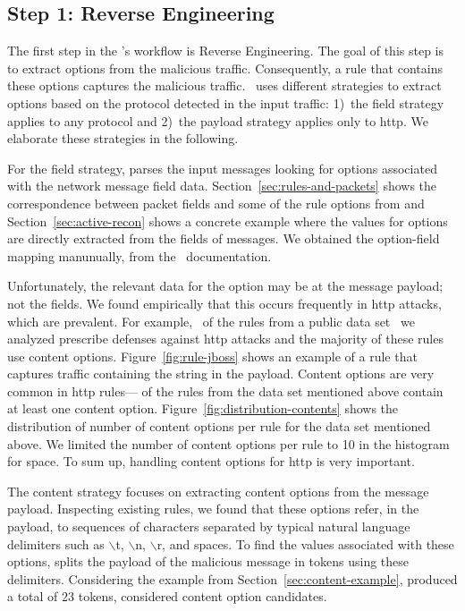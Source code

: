 \documentclass[sigconf,review, anonymous]{acmart}
\begin{document}
\subsection{Step 1: Reverse Engineering}
\label{sec:reverse-engineering}

The first step in the \tname's workflow is Reverse Engineering. The
goal of this step is to extract options from the malicious
traffic. Consequently, a rule that contains these options captures the
malicious traffic. \tname\ uses different strategies to extract
options based on the protocol detected in the input traffic: 1)~the
field strategy applies to any protocol and 2)~the payload strategy
applies only to http. We elaborate these strategies in the following.

For the field strategy, \tname{} parses the input messages looking for
options associated with the network message field
data. Section~\ref{sec:rules-and-packets} shows the correspondence
between packet fields and some of the rule options from \suri and
Section~\ref{sec:active-recon} shows a concrete example where the
values for options are directly extracted from the fields of
messages. We obtained the option-field mapping manunually, from the
\suri\ documentation.

Unfortunately, the relevant data for the option may be at the message
payload; not the fields. We found empirically that this occurs
frequently in http attacks, which are prevalent. For example,
\percHttp\ of the \numrulessuri{} rules from a public data
set~\cite{emerging-threats-open} we analyzed prescribe defenses
against http attacks and the majority of these rules use content
options. Figure~\ref{fig:rule-jboss} shows an example of a rule that
captures traffic containing the string  in the
payload.  Content options are very common in http
rules---\percRulesWithContent{} of the rules from the data set
mentioned above contain at least one content
option. Figure~\ref{fig:distribution-contents} shows the distribution
of number of content options per rule for the data set mentioned
above. We limited the number of content options per rule to 10 in the
histogram for space.   To sum up, handling content options for
http is very important.

The content strategy focuses on extracting content options from the
message payload. Inspecting existing rules, we found that these
options refer, in the payload, to sequences of characters separated by
typical natural language delimiters such as $\backslash$t,
$\backslash$n, $\backslash$r, and spaces. To find the values
associated with these options, \tname{} splits the payload of the
malicious message in tokens using these delimiters.  Considering the
example from Section~\ref{sec:content-example}, \tname{} produced a
total of 23 tokens, considered content option candidates.
\end{document}
